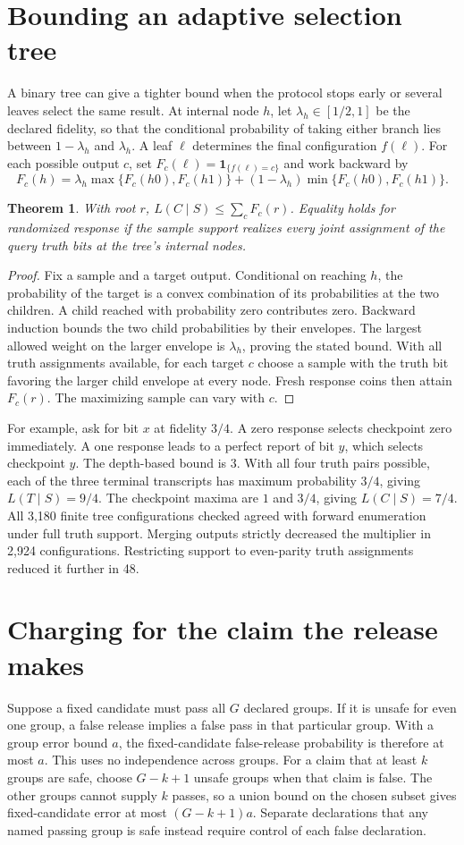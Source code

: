 \documentclass[11pt]{article}
\newtheorem{theorem}{Theorem}
\begin{document}
\section{Bounding an adaptive selection tree}
A binary tree can give a tighter bound when the protocol stops early
or several leaves select the same result. At internal node $h$,
let $\lambda_h\in[1/2,1]$ be the declared fidelity, so that the
conditional probability of taking either branch lies between
$1-\lambda_h$ and $\lambda_h$. A leaf $\ell$ determines the final
configuration $f(\ell)$. For each possible output $c$, set
$F_c(\ell)=\mathbf 1_{\{f(\ell)=c\}}$ and work backward by
\[
 F_c(h)=\lambda_h\max\{F_c(h0),F_c(h1)\}
       +(1-\lambda_h)\min\{F_c(h0),F_c(h1)\}.
\]
\begin{theorem}
With root $r$, $L(C\mid S)\le\sum_c F_c(r)$. Equality holds
for randomized response if the sample support realizes every joint
assignment of the query truth bits at the tree's internal nodes.
\end{theorem}
\begin{proof}
Fix a sample and a target output. Conditional on reaching $h$,
the probability of the target is a convex combination of its
probabilities at the two children. A child reached with
probability zero contributes zero. Backward induction bounds
the two child probabilities by their envelopes. The largest
allowed weight on the larger envelope is $\lambda_h$, proving
the stated bound. With all truth assignments available, for
each target $c$ choose a sample with the truth bit favoring
the larger child envelope at every node. Fresh response coins
then attain $F_c(r)$. The maximizing sample can vary with $c$.
\end{proof}
For example, ask for bit $x$ at fidelity $3/4$. A zero response
selects checkpoint zero immediately. A one response leads to a
perfect report of bit $y$, which selects checkpoint $y$. The
depth-based bound is $3$. With all four truth pairs possible,
each of the three terminal transcripts has maximum probability
$3/4$, giving $L(T\mid S)=9/4$. The checkpoint maxima are
$1$ and $3/4$, giving $L(C\mid S)=7/4$. All 3,180 finite
tree configurations checked agreed with forward enumeration
under full truth support. Merging outputs strictly decreased
the multiplier in 2,924 configurations. Restricting support
to even-parity truth assignments reduced it further in 48.

\section{Charging for the claim the release makes}
Suppose a fixed candidate must pass all $G$ declared groups.
If it is unsafe for even one group, a false release implies a
false pass in that particular group. With a group error bound
$a$, the fixed-candidate false-release probability is therefore
at most $a$. This uses no independence across groups.
For a claim that at least $k$ groups are safe, choose
$G-k+1$ unsafe groups when that claim is false. The other
groups cannot supply $k$ passes, so a union bound on the
chosen subset gives fixed-candidate error at most
$(G-k+1)a$. Separate declarations that any named passing
group is safe instead require control of each false declaration.
\end{document}
